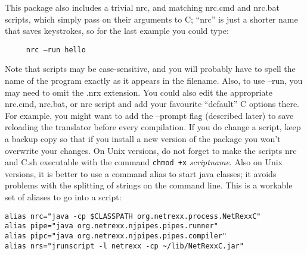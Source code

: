 \begin{enumerate}
\begin{lstlisting}
\end{lstlisting}
This package also includes a trivial nrc, and matching nrc.cmd and nrc.bat scripts, which simply pass on their arguments to \nr{}C; “nrc” is just a shorter name that saves keystrokes, so for the last example you could type: 
 \begin{lstlisting}
     nrc –run hello
\end{lstlisting}
Note that scripts may be case-sensitive, and you will probably have to spell the name of the program exactly as it appears in the filename. Also, to use –run, you may need to omit the .nrx extension. 
You could also edit the appropriate nrc.cmd, nrc.bat, or nrc script
and add your favourite “default” \nr{}C options there. For example,
you might want to add the –prompt flag (described later) to save
reloading the translator before every compilation. If you do change a
script, keep a backup copy so that if you install a new version of the
\nr{} package you won’t overwrite your changes. On Unix versions, do
not forget to make the scripts nrc and \nr{}C.sh executable with the
command \texttt{chmod +x} \emph{scriptname}. Also on Unix versions, it
is better to use a command alias to start java classes; it avoids
problems with the splitting of strings on the command line. This is a
workable set of aliases to go into a  script:
\begin{lstlisting}
alias nrc="java -cp $CLASSPATH org.netrexx.process.NetRexxC"
alias pipe="java org.netrexx.njpipes.pipes.runner"
alias pipc="java org.netrexx.njpipes.pipes.compiler"
alias nrs="jrunscript -l netrexx -cp ~/lib/NetRexxC.jar"
\end{lstlisting}
\end{enumerate}
